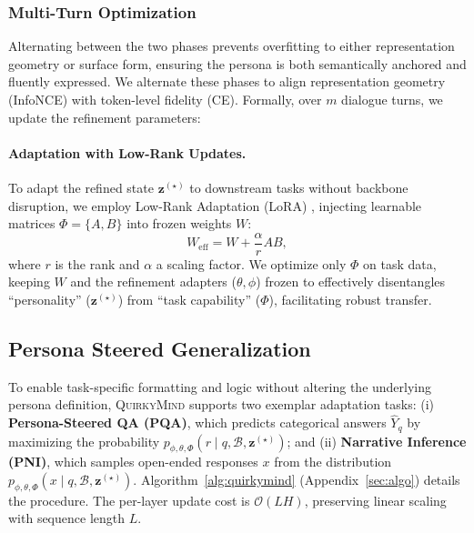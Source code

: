 \subsubsection{Multi-Turn Optimization}
Alternating between the two phases prevents overfitting to either representation geometry or surface form, ensuring the persona is both semantically anchored and fluently expressed.
We alternate these phases to align representation geometry (InfoNCE\cite{rusak2024infonce}) with token-level fidelity (CE). Formally, over $m$ dialogue turns, we update the refinement parameters:




\paragraph{Adaptation with Low-Rank Updates.}
To adapt the refined state $\mathbf{z}^{(\star)}$ to downstream tasks without backbone disruption, we employ Low-Rank Adaptation (LoRA) \citep{hu2022lora}, injecting learnable matrices $\Phi = \{A, B\}$ into frozen weights $W$: 
\begin{equation}
\label{eq:lora}
    W_{\text{eff}} = W + \frac{\alpha}{r}AB,
\end{equation}
where $r$ is the rank and $\alpha$ a scaling factor. We optimize only $\Phi$ on task data, keeping $W$ and the refinement adapters ($\theta, \phi$) frozen to effectively disentangles ``personality'' ($\mathbf{z}^{(\star)}$) from ``task capability'' ($\Phi$), facilitating robust transfer.
    






\subsection{Persona Steered Generalization}\label{sec:transfer}
To enable task-specific formatting and logic without altering the underlying persona definition, \textsc{QuirkyMind} supports two exemplar adaptation tasks: (i) \textbf{Persona-Steered QA (PQA)}, which predicts categorical answers $\hat{Y}_q$ by maximizing the probability $p_{\phi,\theta,\Phi}(r \mid q, \mathcal{B}, \mathbf{z}^{(\star)})$; and (ii) \textbf{Narrative Inference (PNI)}, which samples open-ended responses $x$ from the distribution $p_{\phi,\theta,\Phi}(x \mid q, \mathcal{B}, \mathbf{z}^{(\star)})$. Algorithm~\ref{alg:quirkymind} (Appendix~\ref{sec:algo}) details the procedure. The per-layer update cost is $\mathcal{O}(LH)$, preserving linear scaling with sequence length $L$.








